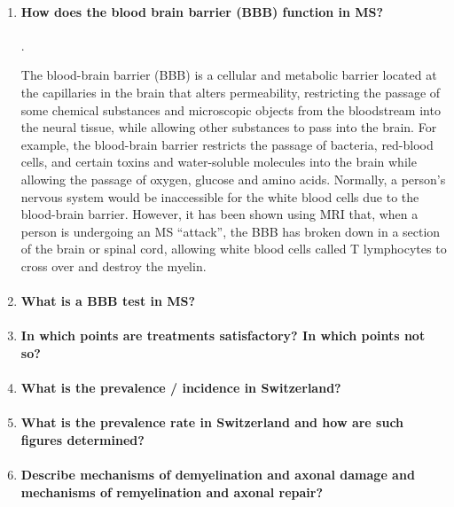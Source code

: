 \documentclass[12pt,article,oneside,a4paper]{memoir}
\begin{document}
\begin{enumerate}
\item \paragraph{How does the blood brain barrier (BBB) function in MS?}.

The blood-brain barrier (BBB) is a cellular and metabolic barrier located at the capillaries in the brain that alters permeability, restricting the passage of some chemical substances and microscopic objects from the bloodstream into the neural tissue, while allowing other substances to pass into the brain. For example, the blood-brain barrier restricts the passage of bacteria, red-blood cells, and certain toxins and water-soluble molecules into the brain while allowing the passage of oxygen, glucose and amino acids. Normally, a person’s nervous system would be inaccessible for the white blood cells due to the blood-brain barrier. However, it has been shown using MRI that, when a person is undergoing an MS ``attack'', the BBB has broken down in a section of the brain or spinal cord, allowing white blood cells called T lymphocytes to cross over and destroy the myelin. 

\item \paragraph{What is a BBB test in MS?}

\item \paragraph{In which points are treatments satisfactory?  In which points not so?}

\item \paragraph{What is the prevalence / incidence in Switzerland?}

\item \paragraph{What is the prevalence rate in Switzerland and how are such figures determined?}

\item \paragraph{Describe mechanisms of demyelination and axonal damage and mechanisms of remyelination and axonal repair?}


\end{enumerate}
\end{document}
